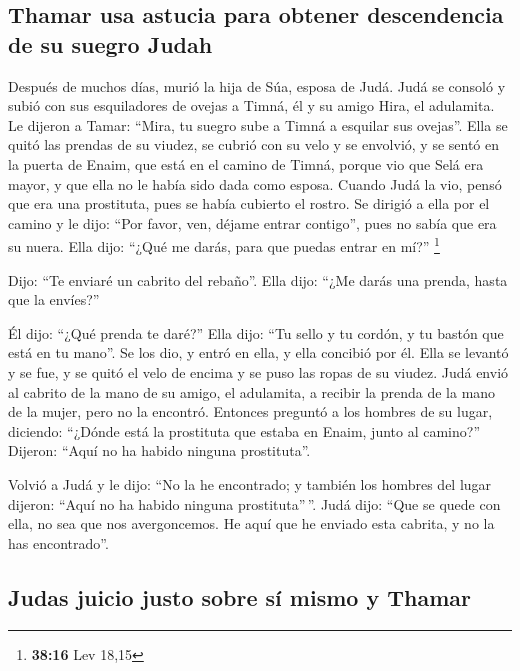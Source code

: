\begin{paracol}{2}
\hypertarget{thamar-usa-astucia-para-obtener-descendencia-de-su-suegro-judah}{%
\subsection{Thamar usa astucia para obtener descendencia de su suegro
Judah}\label{thamar-usa-astucia-para-obtener-descendencia-de-su-suegro-judah}}

 Después de muchos días, murió la hija de Súa, esposa de
Judá. Judá se consoló y subió con sus esquiladores de ovejas a Timná, él
y su amigo Hira, el adulamita.  Le dijeron a Tamar:
``Mira, tu suegro sube a Timná a esquilar sus ovejas''. 
Ella se quitó las prendas de su viudez, se cubrió con su velo y se
envolvió, y se sentó en la puerta de Enaim, que está en el camino de
Timná, porque vio que Selá era mayor, y que ella no le había sido dada
como esposa.  Cuando Judá la vio, pensó que era una
prostituta, pues se había cubierto el rostro.  Se dirigió
a ella por el camino y le dijo: ``Por favor, ven, déjame entrar
contigo'', pues no sabía que era su nuera. Ella dijo: ``¿Qué me darás,
para que puedas entrar en mí?'' \footnote{\textbf{38:16} Lev 18,15}

 Dijo: ``Te enviaré un cabrito del rebaño''. Ella dijo:
``¿Me darás una prenda, hasta que la envíes?''

 Él dijo: ``¿Qué prenda te daré?'' Ella dijo: ``Tu sello
y tu cordón, y tu bastón que está en tu mano''. Se los dio, y entró en
ella, y ella concibió por él.  Ella se levantó y se fue,
y se quitó el velo de encima y se puso las ropas de su viudez.
 Judá envió al cabrito de la mano de su amigo, el
adulamita, a recibir la prenda de la mano de la mujer, pero no la
encontró.  Entonces preguntó a los hombres de su lugar,
diciendo: ``¿Dónde está la prostituta que estaba en Enaim, junto al
camino?'' Dijeron: ``Aquí no ha habido ninguna prostituta''.

 Volvió a Judá y le dijo: ``No la he encontrado; y
también los hombres del lugar dijeron: ``Aquí no ha habido ninguna
prostituta''\,''.  Judá dijo: ``Que se quede con ella, no
sea que nos avergoncemos. He aquí que he enviado esta cabrita, y no la
has encontrado''.

\hypertarget{judas-juicio-justo-sobre-suxed-mismo-y-thamar}{%
\subsection{Judas juicio justo sobre sí mismo y
Thamar}\label{judas-juicio-justo-sobre-suxed-mismo-y-thamar}}


\end{paracol}
